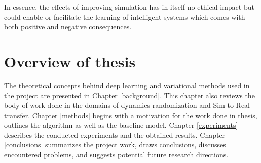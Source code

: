 
In essence, the effects of improving simulation has in itself no ethical impact but could enable or facilitate the learning of intelligent systems which comes with both positive and negative consequences.

\section{Overview of thesis}
The theoretical concepts behind deep learning and variational methods used in the project are presented in Chapter \ref{background}. This chapter also reviews the body of work done in the domains of dynamics randomization and Sim-to-Real transfer. Chapter \ref{methods} begins with a motivation for the work done in thesis, outlines the \dettostoc{} algorithm as well as the baseline model. Chapter \ref{experiments} describes the conducted experiments and the obtained results. Chapter \ref{conclusions} summarizes the project work, draws conclusions, discusses encountered problems, and suggests potential future research directions.